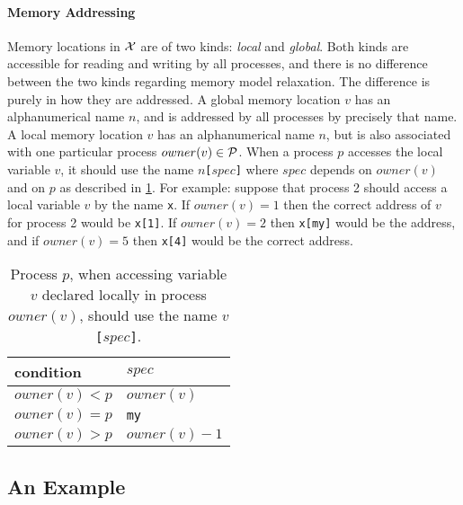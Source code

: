 \documentclass[a4paper]{article}
\begin{document}
\paragraph{Memory Addressing}
Memory locations in $\mathcal{X}$ are of two kinds: \emph{local} and
\emph{global}. Both kinds are accessible for reading and writing by
all processes, and there is no difference between the two kinds
regarding memory model relaxation. The difference is purely in how
they are addressed. A global memory location $v$ has an alphanumerical
name $n$, and is addressed by all processes by precisely that name. A
local memory location $v$ has an alphanumerical name $n$, but is also
associated with one particular process $owner(v)\in\mathcal{P}$. When a
process $p$ accesses the local variable $v$, it should use the name
$n$\verb+[+$spec$\verb+]+ where $spec$ depends on $owner(v)$ and on
$p$ as described in \cref{tbl:locvarnames}. For example: suppose that
process 2 should access a local variable $v$ by the name \verb+x+. If
$owner(v) = 1$ then the correct address of $v$ for process 2 would be
\verb+x[1]+. If $owner(v) = 2$ then \verb+x[my]+ would be the address,
and if $owner(v) = 5$ then \verb+x[4]+ would be the correct address.

\begin{table}[ht]
  \begin{center}
    \begin{tabular}{|l|l|}
      \hline
      condition & $spec$\\
      \hline
      $owner(v) < p$ & $owner(v)$\\
      $owner(v) = p$ & \verb+my+\\
      $owner(v) > p$ & $owner(v)-1$\\
      \hline
    \end{tabular}
  \end{center}
  \caption{Process $p$, when accessing variable $v$ declared locally
    in process $owner(v)$, should use the name
    $v${\tt [}$spec${\tt ]}.}
  \label{tbl:locvarnames}
\end{table}

\subsection{An Example}
\end{document}
